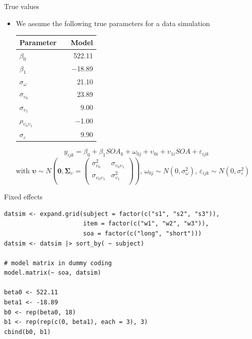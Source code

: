 \documentclass[aspectratio=169]{beamer}
\newcommand{\gvect}[1]{\boldsymbol{#1}}
\newcommand{\gmat}[1]{\boldsymbol{#1}}
\begin{document}
\begin{frame}{True values}
  \begin{itemize}
    \item We assume the following true parameters for a data simulation
    \vspace{.2cm}
  \begin{center}
  \begin{tabular}{lrr}
    \hline
    Parameter && Model \\
    \hline
    $\beta_0$                     && 522.11\\
    $\beta_1$                     && $-$18.89\\
    $\sigma_{\omega}$             && 21.10\\
    $\sigma_{\upsilon_0}$         && 23.89\\
    $\sigma_{\upsilon_1}$         && 9.00\\
    $\rho_{\upsilon_0\upsilon_1}$ && $-$1.00\\
    $\sigma_{\varepsilon}$        && 9.90\\
    \hline
  \end{tabular}
  \end{center}
     \[
       y_{ijk} = \beta_0 + \beta_1 SOA_k + \omega_{0j} + \upsilon_{0i} +
       \upsilon_{1i} SOA + \varepsilon_{ijk} 
  \]
\small
with $\gvect{\upsilon} \sim N\left(\gvect{0}, \gmat{\Sigma}_{\upsilon} = 
    \begin{pmatrix}
      \sigma^2_{\upsilon_0} & \sigma_{\upsilon_0\upsilon_1} \\
      \sigma_{\upsilon_0\upsilon_1} & \sigma^2_{\upsilon_1} \\
    \end{pmatrix}\right)$,
  $\omega_{0j} \sim N(0, \sigma_{\omega}^2)$, $\varepsilon_{ijk} \sim N(0,
  \sigma_{\varepsilon}^2)$ 
  \end{itemize}
\end{frame}

\begin{frame}[fragile]{Fixed effects}
  \begin{lstlisting}
datsim <- expand.grid(subject = factor(c("s1", "s2", "s3")),
                      item = factor(c("w1", "w2", "w3")),
                      soa = factor(c("long", "short")))
datsim <- datsim |> sort_by( ~ subject)

# model matrix in dummy coding
model.matrix(~ soa, datsim)

beta0 <- 522.11
beta1 <- -18.89
b0 <- rep(beta0, 18)
b1 <- rep(rep(c(0, beta1), each = 3), 3)
cbind(b0, b1)
  \end{lstlisting}
\end{frame}
\end{document}
